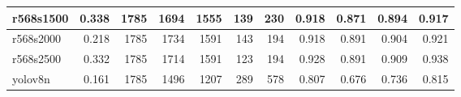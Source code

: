 \begin{table}
{\begin{tabular}{|l|r|r|r|r|r|r|r|r|r|r|}
r568s1500    & 0.338 & 1785 & 1694 & 1555 & 139 & 230 & 0.918 & 0.871 & 0.894 & 0.917 \\ \hline
r568s2000    & 0.218 & 1785 & 1734 & 1591 & 143 & 194 & 0.918 & 0.891 & 0.904 & 0.921 \\ \hline
r568s2500    & 0.332 & 1785 & 1714 & 1591 & 123 & 194 & 0.928 & 0.891 & 0.909 & 0.938 \\ \hline
yolov8n      & 0.161 & 1785 & 1496 & 1207 & 289 & 578 & 0.807 & 0.676 & 0.736 & 0.815 \\ \hline
\end{tabular}
}
\end{table}

